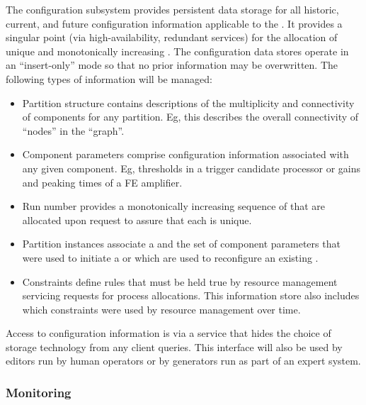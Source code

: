 The  configuration subsystem provides persistent data storage for all historic, current, and future configuration information applicable to the .
It provides a singular point (via high-availability, redundant services) for the allocation of unique and monotonically increasing .
The configuration data stores operate in an ``insert-only'' mode so that no prior information may be overwritten. 
The following types of information will be managed:

\begin{itemize}

\item Partition structure contains descriptions of the multiplicity and connectivity of  components for any partition.   Eg, this describes the overall connectivity of ``nodes'' in the  ``graph''.

\item Component parameters comprise configuration information associated with any given  component.  Eg, thresholds in a trigger candidate processor or gains and peaking times of a FE amplifier.

\item Run number provides a monotonically increasing sequence of  that are allocated upon request to assure that each is unique.

\item Partition instances associate a  and the set of component parameters that were used to initiate a  or which are used to reconfigure an existing .  

\item Constraints define rules that must be held true by resource management servicing requests for process allocations.  This information store also includes which constraints were used by resource management over time.
\end{itemize}


Access to configuration information is via a service that hides the choice of storage technology from any client queries.
This interface will also be used by editors run by human operators or by  generators run as part of an expert system.

\subsubsection{Monitoring}
\label{sec:daq:design:ccm:monitoring}

